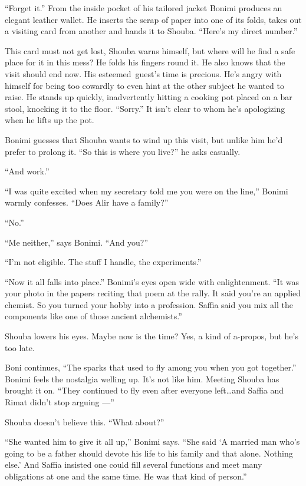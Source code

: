 \documentclass[twoside,11pt]{book}
\begin{document}
``Forget it.'' From the inside pocket of his tailored jacket Bonimi produces an elegant
leather wallet. He inserts the scrap of paper into one of its folds, takes out a visiting card from another and hands
it to Shouba. ``Here's my direct number.''

This card must not get lost, Shouba warns himself, but where will he find a safe place for it in this mess? He folds his
fingers round it. He also knows that the visit should end now. His esteemed~guest's time is precious.
He's{ }angry with himself for being too cowardly to even hint at the other
subject he wanted to raise. He stands up quickly, inadvertently hitting a cooking pot placed on a bar stool, knocking
it to the floor. ``Sorry.'' It isn't clear to whom he's apologizing when he lifts up the
pot.

Bonimi guesses that Shouba wants to wind up this visit, but unlike him he'd prefer to prolong it. ``So this
is where you live?''  he asks casually.

``And work.''

``I was quite excited when my secretary told me you were on the line,'' Bonimi warmly
confesses. ``Does Alir have a family?''

``No.''

``Me neither,'' says Bonimi. ``And you?''

``I'm not eligible. The stuff I handle, the experiments.''

``Now it all falls into place.'' Bonimi's eyes open wide with enlightenment. ``It
was your photo in the papers reciting that poem at the rally. It said you're an applied chemist. So you turned your
hobby into a profession. Saffia said you mix all the components like one of those ancient alchemists.''

Shouba lowers his eyes. Maybe now is the time? Yes, a kind of a-propos, but he's too late.

Boni continues, ``The sparks that used to fly among you when you got together.'' Bonimi feels
the nostalgia welling up. It's not like him. Meeting Shouba has brought it on. ``They continued to fly
even after everyone left{\ldots}and Saffia and Rimat didn't stop arguing ---''

Shouba doesn't believe this. ``What about?''

``She wanted {him} to give it all up,'' Bonimi says. ``She said
`A married man who's going to be a father should devote his life to his family and that alone. Nothing else.{}' And
Saffia insisted one could fill several functions and meet many obligations at one and the same time. He was that kind
of person.''
\end{document}
